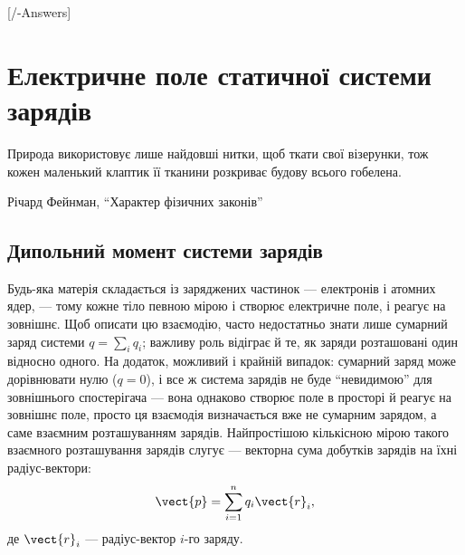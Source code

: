 
[\currfilebase/\currfilebase-Answers]
\chapter{Електричне поле статичної системи зарядів}\label{\currfilebase}\hypertarget{ChargeSystem}{}
\graphicspath{{\currfilebase/Pictures}}
\epigraph{\Alexander Природа використовує лише найдовші нитки, щоб ткати свої візерунки, тож кожен
маленький клаптик її тканини розкриває будову всього гобелена.}{Річард Фейнман,
\enquote{Характер фізичних законів}}


\section{Дипольний момент системи зарядів}\hypertarget{dipole-moment}{}

Будь-яка матерія складається із заряджених частинок --- електронів і атомних ядер, --- тому кожне тіло певною мірою і створює електричне поле, і
реагує на зовнішнє. Щоб описати цю взаємодію, часто недостатньо знати лише сумарний заряд системи $q = \sum_i q_i$; важливу роль відіграє й те, як
заряди розташовані один відносно одного. На додаток, можливий і крайній випадок: сумарний заряд може дорівнювати нулю ($q=0$), і все ж система
зарядів не буде \enquote{невидимою} для зовнішнього спостерігача --- вона однаково створює поле в просторі й реагує на зовнішнє поле, просто ця
взаємодія визначається вже не сумарним зарядом, а саме взаємним розташуванням зарядів. Найпростішою кількісною мірою такого взаємного розташування зарядів слугує  --- векторна сума добутків зарядів на їхні
радіус-вектори:
\begin{equation}\label{eq:el_momentum}
	\vect{p} = \sum_{i=1}^{n}q_i\vect{r}_i,
\end{equation}
де $\vect{r}_i$ --- радіус-вектор $i$-го заряду.

